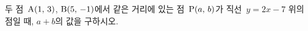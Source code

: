 두 점~$\mathrm{A}(1,\,3)$, $\mathrm{B}(5,\,-1)$에서 같은 거리에 있는 점~$\mathrm{P}(a,\,b)$가 직선~$y=2x-7$ 위의 점일 때, $a+b$의 값을 구하시오.
